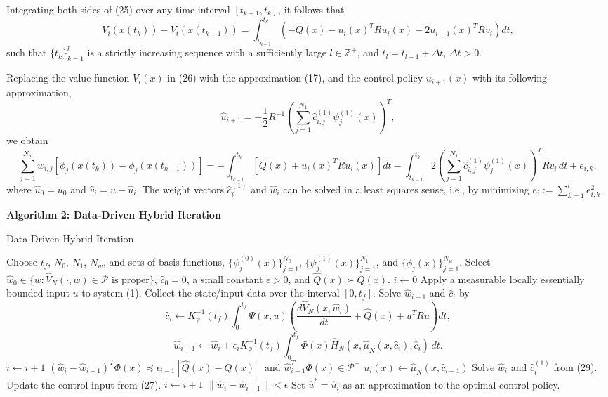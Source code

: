 \documentclass[12pt]{article}
\begin{document}
Integrating both sides of (25) over any time interval \([t_{k-1}, t_k]\), it follows that
\[
V_i(x(t_k)) - V_i(x(t_{k-1})) = \int_{t_{k-1}}^{t_k} \left( -Q(x) - u_i(x)^T R u_i(x) - 2 u_{i+1}(x)^T R v_i \right) dt,
\]
such that \( \{ t_k \}_{k=1}^l \) is a strictly increasing sequence with a sufficiently large \( l \in \mathbb{Z}^+ \), and \( t_l = t_{l-1} + \Delta t \), \( \Delta t > 0 \).

Replacing the value function \( V_i(x) \) in (26) with the approximation (17), and the control policy \( u_{i+1}(x) \) with its following approximation,
\[
\hat{u}_{i+1} = -\frac{1}{2} R^{-1} \left( \sum_{j=1}^{N_1} \hat{c}_{i,j}^{(1)} \psi_j^{(1)}(x) \right)^T,
\]
we obtain
\[
\sum_{j=1}^{N_w} \hat{w}_{i,j} \left[ \phi_j(x(t_k)) - \phi_j(x(t_{k-1})) \right] = -\int_{t_{k-1}}^{t_k} \left[ Q(x) + u_i(x)^T R u_i(x) \right] dt - \int_{t_{k-1}}^{t_k} 2 \left( \sum_{j=1}^{N_1} \hat{c}_{i,j}^{(1)} \psi_j^{(1)}(x) \right)^T R v_i \, dt + e_{i,k},
\]
where \( \hat{u}_0 = u_0 \) and \( \hat{v}_i = u - \hat{u}_i \). The weight vectors \( \hat{c}_i^{(1)} \) and \( \hat{w}_i \) can be solved in a least squares sense, i.e., by minimizing \( e_i := \sum_{k=1}^l e_{i,k}^2 \).

\textbf{Algorithm 2: Data-Driven Hybrid Iteration}

\begin{algorithm}
\caption{Data-Driven Hybrid Iteration}
\begin{algorithmic}[1]
\State Choose \( t_f \), \( N_0 \), \( N_1 \), \( N_w \), and sets of basis functions, \( \{ \psi_j^{(0)}(x) \}_{j=1}^{N_0} \), \( \{ \psi_j^{(1)}(x) \}_{j=1}^{N_1} \), and \( \{ \phi_j(x) \}_{j=1}^{N_w} \).
\State Select \( \hat{w}_0 \in \{ w : \hat{V}_N(\cdot, w) \in \mathcal{P} \text{ is proper} \} \), \( \hat{c}_0 = 0 \), a small constant \( \epsilon > 0 \), and \( \hat{Q}(x) \succ Q(x) \).
\State \( i \gets 0 \)
\State Apply a measurable locally essentially bounded input \( u \) to system (1).
\State Collect the state/input data over the interval \([0, t_f]\).
\Repeat
    \State Solve \( \hat{w}_{i+1} \) and \( \hat{c}_i \) by
    \[
    \hat{c}_i \gets K_\psi^{-1}(t_f) \int_0^{t_f} \Psi(x, u) \left( \frac{d \hat{V}_N(x, \hat{w}_i)}{dt} + \hat{Q}(x) + u^T R u \right) dt,
    \]
    \[
    \hat{w}_{i+1} \gets \hat{w}_i + \epsilon_i K_\phi^{-1}(t_f) \int_0^{t_f} \Phi(x) \hat{H}_N(x, \hat{\mu}_N(x, \hat{c}_i), \hat{c}_i) \, dt.
    \]
    \State \( i \gets i + 1 \)
\Until \( (\hat{w}_i - \hat{w}_{i-1})^T \Phi(x) \preceq \epsilon_{i-1} [\hat{Q}(x) - Q(x)] \) and \( \hat{w}_{i-1}^T \Phi(x) \in \mathcal{P}^+ \)
\State \( u_i(x) \gets \hat{\mu}_N(x, \hat{c}_{i-1}) \)
\Repeat
    \State Solve \( \hat{w}_i \) and \( \hat{c}_i^{(1)} \) from (29).
    \State Update the control input from (27).
    \State \( i \gets i + 1 \)
\Until \( \| \hat{w}_i - \hat{w}_{i-1} \| < \epsilon \)
\State Set \( \hat{u}^* = \hat{u}_i \) as an approximation to the optimal control policy.
\end{algorithmic}
\end{algorithm}
\end{document}
